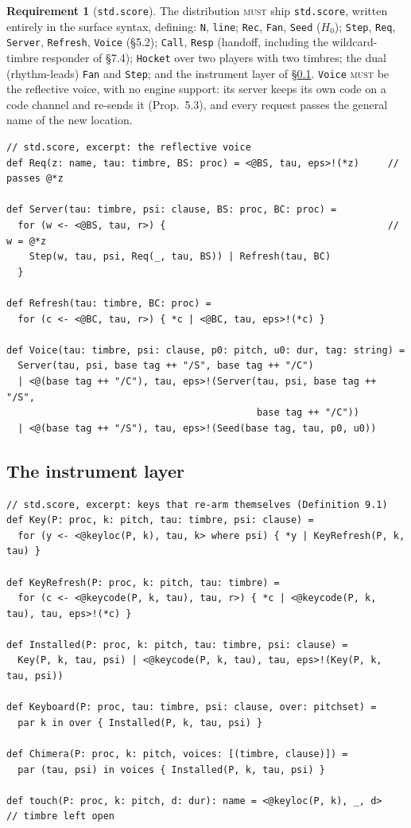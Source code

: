 \documentclass[11pt,a4paper]{article}
\theoremstyle{definition}
\newtheorem{requirement}{Requirement}[section]
\theoremstyle{remark}
\newcommand{\MUST}{\textsc{must}}
\begin{document}
\begin{requirement}[\texttt{std.score}]\label{req:std}
The distribution \MUST{} ship \texttt{std.score}, written entirely in the
surface syntax, defining: \texttt{N}, \texttt{line}; \texttt{Rec}, \texttt{Fan},
\texttt{Seed} ($H_0$); \texttt{Step}, \texttt{Req}, \texttt{Server},
\texttt{Refresh}, \texttt{Voice} (\S5.2); \texttt{Call}, \texttt{Resp}
(handoff, including the wildcard-timbre responder of \S7.4); \texttt{Hocket}
over two players with two timbres; the dual (rhythm-leads) \texttt{Fan} and
\texttt{Step}; and the instrument layer of \S\ref{ssec:instlib}. \texttt{Voice}
\MUST{} be the reflective voice, with no engine support: its server keeps its
own code on a code channel and re-sends it (Prop.~5.3), and every request
passes the general name of the new location.
\end{requirement}

\begin{lstlisting}[language=score]
// std.score, excerpt: the reflective voice
def Req(z: name, tau: timbre, BS: proc) = <@BS, tau, eps>!(*z)     // passes @*z

def Server(tau: timbre, psi: clause, BS: proc, BC: proc) =
  for (w <- <@BS, tau, r>) {                                       // w = @*z
    Step(w, tau, psi, Req(_, tau, BS)) | Refresh(tau, BC)
  }

def Refresh(tau: timbre, BC: proc) =
  for (c <- <@BC, tau, r>) { *c | <@BC, tau, eps>!(*c) }

def Voice(tau: timbre, psi: clause, p0: pitch, u0: dur, tag: string) =
  Server(tau, psi, base tag ++ "/S", base tag ++ "/C")
  | <@(base tag ++ "/C"), tau, eps>!(Server(tau, psi, base tag ++ "/S",
                                            base tag ++ "/C"))
  | <@(base tag ++ "/S"), tau, eps>!(Seed(base tag, tau, p0, u0))
\end{lstlisting}

\subsection{The instrument layer}\label{ssec:instlib}

\begin{lstlisting}[language=score]
// std.score, excerpt: keys that re-arm themselves (Definition 9.1)
def Key(P: proc, k: pitch, tau: timbre, psi: clause) =
  for (y <- <@keyloc(P, k), tau, k> where psi) { *y | KeyRefresh(P, k, tau) }

def KeyRefresh(P: proc, k: pitch, tau: timbre) =
  for (c <- <@keycode(P, k, tau), tau, r>) { *c | <@keycode(P, k, tau), tau, eps>!(*c) }

def Installed(P: proc, k: pitch, tau: timbre, psi: clause) =
  Key(P, k, tau, psi) | <@keycode(P, k, tau), tau, eps>!(Key(P, k, tau, psi))

def Keyboard(P: proc, tau: timbre, psi: clause, over: pitchset) =
  par k in over { Installed(P, k, tau, psi) }

def Chimera(P: proc, k: pitch, voices: [(timbre, clause)]) =
  par (tau, psi) in voices { Installed(P, k, tau, psi) }

def touch(P: proc, k: pitch, d: dur): name = <@keyloc(P, k), _, d>   // timbre left open
\end{lstlisting}
\end{document}
